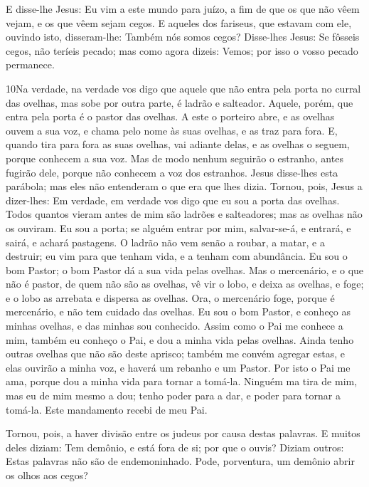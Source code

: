 E disse-lhe Jesus: Eu vim a este mundo para juízo, a fim de que
os que não vêem vejam, e os que vêem sejam cegos. E aqueles
dos fariseus, que estavam com ele, ouvindo isto, disseram-lhe:
Também nós somos cegos? Disse-lhes Jesus: Se fôsseis cegos,
não teríeis pecado; mas como agora dizeis: Vemos; por isso o vosso
pecado permanece.

\medskip

\lettrine{10} Na verdade, na verdade vos digo que aquele que
não entra pela porta no curral das ovelhas, mas sobe por outra
parte, é ladrão e salteador. Aquele, porém, que entra pela porta
é o pastor das ovelhas. A este o porteiro abre, e as ovelhas
ouvem a sua voz, e chama pelo nome às suas ovelhas, e as traz para
fora. E, quando tira para fora as suas ovelhas, vai adiante
delas, e as ovelhas o seguem, porque conhecem a sua voz. Mas de
modo nenhum seguirão o estranho, antes fugirão dele, porque não
conhecem a voz dos estranhos. Jesus disse-lhes esta parábola;
mas eles não entenderam o que era que lhes dizia. Tornou, pois,
Jesus a dizer-lhes: Em verdade, em verdade vos digo que eu sou a
porta das ovelhas. Todos quantos vieram antes de mim são ladrões
e salteadores; mas as ovelhas não os ouviram. Eu sou a porta; se
alguém entrar por mim, salvar-se-á, e entrará, e sairá, e achará
pastagens. O ladrão não vem senão a roubar, a matar, e a
destruir; eu vim para que tenham vida, e a tenham com abundância.
Eu sou o bom Pastor; o bom Pastor dá a sua vida pelas
ovelhas. Mas o mercenário, e o que não é pastor, de quem não
são as ovelhas, vê vir o lobo, e deixa as ovelhas, e foge; e o lobo
as arrebata e dispersa as ovelhas. Ora, o mercenário foge,
porque é mercenário, e não tem cuidado das ovelhas. Eu sou o
bom Pastor, e conheço as minhas ovelhas, e das minhas sou conhecido.
Assim como o Pai me conhece a mim, também eu conheço o Pai, e
dou a minha vida pelas ovelhas. Ainda tenho outras ovelhas
que não são deste aprisco; também me convém agregar estas, e elas
ouvirão a minha voz, e haverá um rebanho e um Pastor. Por
isto o Pai me ama, porque dou a minha vida para tornar a tomá-la.
Ninguém ma tira de mim, mas eu de mim mesmo a dou; tenho
poder para a dar, e poder para tornar a tomá-la. Este mandamento
recebi de meu Pai.

Tornou, pois, a haver divisão entre os judeus por causa destas
palavras. E muitos deles diziam: Tem demônio, e está fora de
si; por que o ouvis? Diziam outros: Estas palavras não são de
endemoninhado. Pode, porventura, um demônio abrir os olhos aos
cegos?

